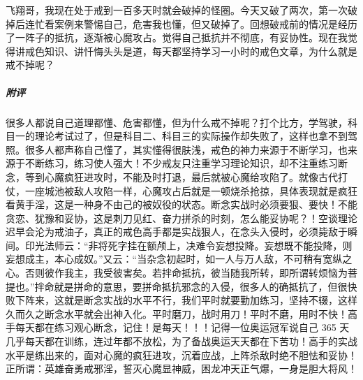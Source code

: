 \begin{case}
    飞翔哥，我现在处于戒到一百多天时就会破掉的怪圈。今天又破了两次，第一次破掉后连忙看案例来警惕自己，危害我也懂，但又破掉了。回想破戒前的情况是经历了一阵子的抵抗，逐渐被心魔攻占。觉得自己抵抗并不彻底，有妥协性。现在我觉得讲戒色知识、讲忏悔头头是道，每天都坚持学习一小时的戒色文章，为什么就是戒不掉呢？
    \subparagraph{附评} 很多人都说自己道理都懂、危害都懂，但为什么戒不掉呢？打个比方，学驾驶，科目一的理论考试过了，但是科目二、科目三的实际操作却失败了，这样也拿不到驾照。很多人都声称自己懂了，其实懂得很肤浅，戒色的神力来源于不断学习，也来源于不断练习，练习使人强大！不少戒友只注重学习理论知识，却不注重练习断念，等到心魔疯狂进攻时，不能及时打退，最后就被心魔给攻陷了。就像古代打仗，一座城池被敌人攻陷一样，心魔攻占后就是一顿烧杀抢掠，具体表现就是疯狂看黄手淫，这是一种身不由己的被奴役的状态。断念实战时必须要狠、要快！不能贪恋、犹豫和妥协，这是刺刀见红、奋力拼杀的时刻，怎么能妥协呢？！空谈理论迟早会沦为戒油子，真正的戒色高手都是实战狠人，在念头入侵时，必须毙敌于瞬间。印光法师云：“非将死字挂在额颅上，决难令妄想投降。妄想既不能投降，则妄想成主，本心成奴。”又云：“当杂念初起时，如一人与万人敌，不可稍有宽纵之心。否则彼作我主，我受彼害矣。若拌命抵抗，彼当随我所转，即所谓转烦恼为菩提也。”拌命就是拼命的意思，要拼命抵抗邪念的入侵，很多人的确抵抗了，但很快败下阵来，这就是断念实战的水平不行，我们平时就要勤加练习，坚持不辍，这样久而久之断念水平就会出神入化。平时磨刀，战时用刀！平时不磨，用时不快！高手每天都在练习观心断念，记住！是每天！！！记得一位奥运冠军说自己 365 天几乎每天都在训练，连过年都不放松，为了备战奥运天天都在下苦功！高手的实战水平是练出来的，面对心魔的疯狂进攻，沉着应战，上阵杀敌时绝不胆怯和妥协！正所谓：英雄奋勇戒邪淫，誓灭心魔显神威，困龙冲天正气爆，一身是胆大将风！
\end{case}

